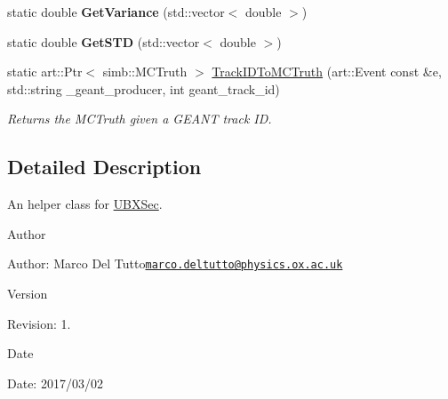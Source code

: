 \begin{DoxyCompactItemize}
\item 
\hypertarget{classUBXSecHelper_ab9aa3a755a90de77e5b61412c04206b2}{static double {\bfseries Get\-Variance} (std\-::vector$<$ double $>$)}\label{classUBXSecHelper_ab9aa3a755a90de77e5b61412c04206b2}

\item 
\hypertarget{classUBXSecHelper_aea63fece97a7aaefb3956eb312a844a0}{static double {\bfseries Get\-S\-T\-D} (std\-::vector$<$ double $>$)}\label{classUBXSecHelper_aea63fece97a7aaefb3956eb312a844a0}

\item 
static art\-::\-Ptr$<$ simb\-::\-M\-C\-Truth $>$ \hyperlink{classUBXSecHelper_a3ab95e69a7b94a8b50de724e2f04f69e}{Track\-I\-D\-To\-M\-C\-Truth} (art\-::\-Event const \&e, std\-::string \-\_\-geant\-\_\-producer, int geant\-\_\-track\-\_\-id)
\begin{DoxyCompactList}\small\item\em Returns the M\-C\-Truth given a G\-E\-A\-N\-T track I\-D. \end{DoxyCompactList}\end{DoxyCompactItemize}


\subsection{Detailed Description}
An helper class for \hyperlink{classUBXSec}{U\-B\-X\-Sec}. 

\begin{DoxyAuthor}{Author}

\end{DoxyAuthor}
\begin{DoxyParagraph}{Author\-:}
Marco Del Tutto\href{mailto:marco.deltutto@physics.ox.ac.uk}{\tt marco.\-deltutto@physics.\-ox.\-ac.\-uk} 
\end{DoxyParagraph}


\begin{DoxyVersion}{Version}

\end{DoxyVersion}
\begin{DoxyParagraph}{Revision\-:}
1. 
\end{DoxyParagraph}


\begin{DoxyDate}{Date}

\end{DoxyDate}
\begin{DoxyParagraph}{Date\-:}
2017/03/02 
\end{DoxyParagraph}


